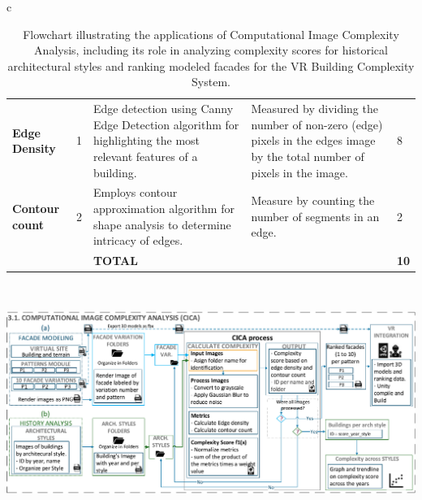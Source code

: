\documentclass[final,5p,times]{elsarticle}
\begin{document}
\begin{table}[htb]
\begin{tabular}{c}
\begin{minipage}{\textwidth}
\begin{tabularx}{\textwidth}{p{3.5cm} p{1cm} X X p{1cm}}
                        \textbf{Edge Density} &
                          1 &
                          Edge detection using Canny Edge Detection algorithm for highlighting the most relevant features of a building.
                            &
                          Measured by dividing the number of non-zero (edge) pixels in the edges image by the total number of pixels in the image.
                            &
                          8\\
                        \textbf{Contour count} &
                          2 &
                          Employs contour approximation algorithm for shape analysis to determine intricacy of edges.
                            &
                          Measure by counting the number of segments in an edge.
                            &
                          2\\ \bottomrule
                           &
                           &
                          \textbf{TOTAL} &
                          &
                          \textbf{10}\\ \bottomrule
                    \end{tabularx}
                \end{minipage}
                \\
                \begin{minipage}{\textwidth}
                    \centering
                    \includegraphics[width= \linewidth]{Images/CICAFlowchart}
                    \caption{Flowchart illustrating the applications of Computational Image Complexity Analysis, including its role in analyzing complexity scores for historical architectural styles and ranking modeled facades for the VR Building Complexity System.}
                  \label{fig:ImageComplexityAnalysisFlowchart}
                \end{minipage}
            \end{tabular}
        \end{table}
\end{document}
